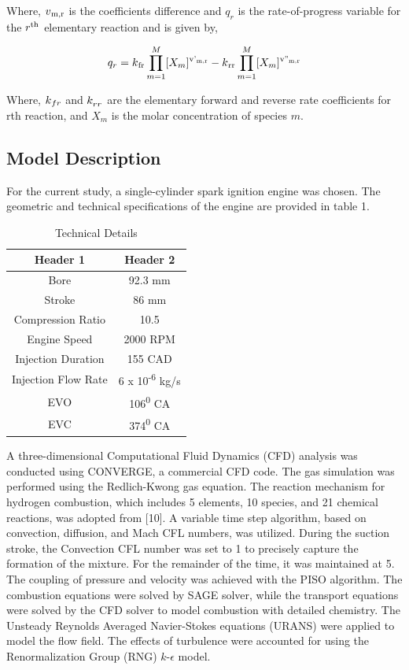 \documentclass[conference]{IEEEtran}
\begin{document}
Where, $v\textsubscript{m,r}$ is the coefficients difference and $q_r$ is the rate-of-progress variable for the $r\textsuperscript{th}$ elementary reaction and is given by,

\begin{gather*}
    q_r = k\textsubscript{fr} \prod_{m=1}^{M} [X_m]\textsuperscript{v'\textsubscript{m,r}} - k\textsubscript{rr} \prod_{m=1}^{M} [X_m]\textsuperscript{v''\textsubscript{m,r}}
\end{gather*}

Where, $k\textsubscript{$fr$}$ and $k_\textsubscript{$rr$}$ are the elementary forward and reverse rate coefficients for rth reaction, and $X_m$ is the molar concentration of species $m$.

\subsection{Model Description}
For the current study, a single-cylinder spark ignition engine was chosen. The geometric and technical specifications of the engine are provided in table 1.

\begin{table}[!ht]
    \centering
    \caption{Technical Details}
    \label{table_1}
    \begin{tabular}{|c|c|}
    \hline
    Header 1 & Header 2 \\
    \hline
    Bore & 92.3 mm \\
    Stroke & 86 mm \\
    Compression Ratio & 10.5 \\
    Engine Speed & 2000 RPM \\
    Injection Duration & 155 CAD \\
    Injection Flow Rate & 6 x 10\textsuperscript{-6} kg/s \\
    EVO & 106\textsuperscript{0} CA \\
    EVC & 374\textsuperscript{0} CA \\
    \hline
    \end{tabular}
    \end{table}

A three-dimensional Computational Fluid Dynamics (CFD) analysis was conducted using CONVERGE, a commercial CFD code. The gas simulation was performed using the Redlich-Kwong gas equation. The reaction mechanism for hydrogen combustion, which includes 5 elements, 10 species, and 21 chemical reactions, was adopted from [10]. A variable time step algorithm, based on convection, diffusion, and Mach CFL numbers, was utilized. During the suction stroke, the Convection CFL number was set to 1 to precisely capture the formation of the mixture. For the remainder of the time, it was maintained at 5. The coupling of pressure and velocity was achieved with the PISO algorithm. The combustion equations were solved by SAGE solver, while the transport equations were solved by the CFD solver to model combustion with detailed chemistry. The Unsteady Reynolds Averaged Navier-Stokes equations (URANS) were applied to model the flow field. The effects of turbulence were accounted for using the Renormalization Group (RNG) $k$-$\epsilon$ model.\\
\end{document}
